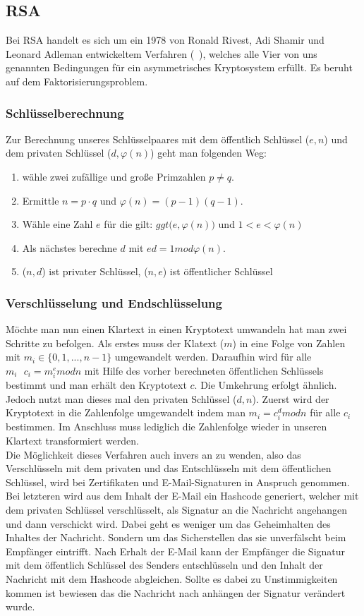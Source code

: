 \documentclass[paper=a4,11pt,german]{scrartcl} %
\begin{document}
\subsection{RSA}
Bei RSA handelt es sich um ein 1978 von Ronald Rivest, Adi Shamir und Leonard Adleman entwickeltem Verfahren (~\cite{Eckert13}), welches   alle Vier von uns genannten Bedingungen für ein asymmetrisches Kryptosystem erfüllt. Es beruht auf dem Faktorisierungsproblem.

\subsubsection{Schlüsselberechnung}
Zur Berechnung unseres Schlüsselpaares mit dem öffentlich Schlüssel ($e,n$) und dem privaten Schlüssel ($d,\varphi(n)$) geht man folgenden Weg:
\begin{enumerate}
\item wähle zwei zufällige und große Primzahlen $p\neq q$.
\item Ermittle $n = p \cdot q$ und $\varphi(n) = (p-1)(q-1)$.
\item Wähle eine Zahl $e$ für die gilt: $ggt\Big(e,\varphi(n)\Big)$ und $1<e<\varphi(n)$
\item Als nächstes berechne $d$ mit $ed = 1 mod \varphi(n)$.
\item ($n,d$) ist privater Schlüssel, ($n,e$) ist öffentlicher Schlüssel
\end{enumerate} 

\subsubsection{Verschlüsselung und Endschlüsselung}
Möchte man nun einen Klartext in einen Kryptotext umwandeln hat man zwei Schritte zu befolgen. Als erstes muss der Klatext ($m$) in eine Folge von Zahlen mit $m_i \in \{0,1,...,n-1\}$ umgewandelt werden. Daraufhin wird für alle $m_i~~~c_i=m^e_i mod n$ mit Hilfe des vorher berechneten öffentlichen Schlüssels bestimmt und man erhält den Kryptotext $c$. %
Die Umkehrung erfolgt ähnlich. Jedoch nutzt man dieses mal den privaten Schlüssel ($d,n$). Zuerst wird der Kryptotext in die Zahlenfolge umgewandelt indem man $m_i = c^d_i mod n$ für alle $c_i$ bestimmen. Im Anschluss muss lediglich die Zahlenfolge wieder in unseren Klartext transformiert werden.
\ \\

Die Möglichkeit dieses Verfahren auch invers an zu wenden, also das Verschlüsseln mit dem privaten und das Entschlüsseln mit dem öffentlichen Schlüssel, wird bei Zertifikaten und E-Mail-Signaturen in Anspruch genommen. Bei letzteren wird aus dem Inhalt der E-Mail ein Hashcode generiert, welcher mit dem privaten Schlüssel verschlüsselt, als Signatur an die Nachricht angehangen und dann verschickt wird. Dabei geht es weniger um das Geheimhalten des Inhaltes der Nachricht. Sondern um das Sicherstellen das sie unverfälscht beim Empfänger eintrifft. Nach Erhalt der E-Mail kann der Empfänger die Signatur mit dem öffentlich Schlüssel des Senders entschlüsseln und den Inhalt der Nachricht mit dem Hashcode abgleichen. Sollte es dabei zu Unstimmigkeiten kommen ist bewiesen das die Nachricht nach anhängen der Signatur verändert wurde.
\end{document}
